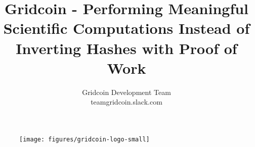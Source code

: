 \documentclass[10pt,a4paper]{article}
\begin{document}
\pagestyle{headings}


\begin{figure}
\centering
\texttt{[image: figures/gridcoin-logo-small]}
\end{figure}


\title{Gridcoin - Performing Meaningful Scientific Computations Instead of Inverting Hashes with Proof of Work}

\author{Gridcoin Development Team\\
teamgridcoin.slack.com\\}


\maketitle



\pagebreak

\tableofcontents

\pagebreak



























\pagebreak




\end{document}
